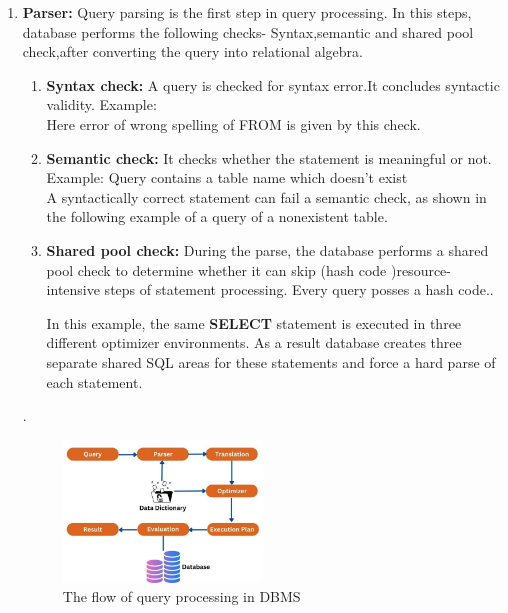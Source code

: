 \begin{enumerate}
\item \textbf{Parser:} Query parsing is the first step in query processing. In this steps, database performs the following checks- Syntax,semantic and shared pool check,after converting the query into relational algebra.\cite{wwwnaukricom-no-date}
    \begin{enumerate}
        \item \textbf{Syntax check:} A query is checked for syntax error.It concludes syntactic validity. Example:\\
        
          Here error of wrong spelling of FROM is given by this check.
        \item \textbf{Semantic check:} It checks whether the statement is meaningful or not. Example: Query contains a table name which doesn't exist\\
        
        A syntactically correct statement can fail a semantic check, as shown in the following example of a query of a nonexistent table.\cite{Oracle}
        \item \textbf{Shared pool check:} During the parse, the database performs a shared pool check to determine whether it can skip (hash code )resource-intensive steps of statement processing. Every query posses a hash code..
        
        In this example, the same \textbf{SELECT} statement is executed in three different optimizer environments. As a result database creates three separate shared SQL areas for these statements and force a hard parse of each statement.\cite{Oracle}
    \end{enumerate}.\\
\begin{figure}[h]
    \centering
    \includegraphics[width=0.5\textwidth]{Figure/Query processing.jpg}
    \caption{The flow of query processing in DBMS}
    \label{fig:my_image}
\end{figure}
    

\end{enumerate}
